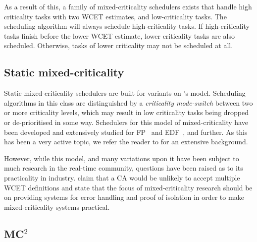 As a result
of this, a family of mixed-criticality schedulers exists that handle high criticality tasks with two
{\gls{WCET}} estimates, and low-criticality tasks.  The scheduling algorithm will always schedule
high-criticality tasks.  If high-criticality tasks finish before the lower \gls{WCET} estimate,
lower criticality tasks are also scheduled.  Otherwise, tasks of lower criticality may not be
scheduled at all. 

\subsection{Static mixed-criticality}

Static mixed-criticality schedulers are built for variants on \citet{Vestal_07}'s model.
Scheduling algorithms in this class are distinguished by a \emph{criticality mode-switch}
between two or more criticality levels,
which may result in low criticality tasks being dropped or de-prioritised in some way. 
Schedulers for this model of mixed-criticality have been developed and extensively studied for
\gls{FP}~\citep{Vestal_07, Pathan:phd} and \gls{EDF}~\citep{Baruah_BDMVS_11}, and further. 
 As this has been a very active topic, we refer the reader to \citet{Burns_Davis_17} for
an extensive background. 

However, while this model, and many variations upon it have been subject to much research
in the real-time community, questions have been raised as to its practicality in industry.
\citet{Ernst_DiNatale_16} claim that a \gls{CA} would be unlikely to accept multiple \gls{WCET}
definitions and state that the focus of mixed-criticality research should be on
providing systems for error handling and proof of isolation in order to make mixed-criticality
systems practical.

\subsection{MC$^2$}
\label{sec:sched-mc2}

